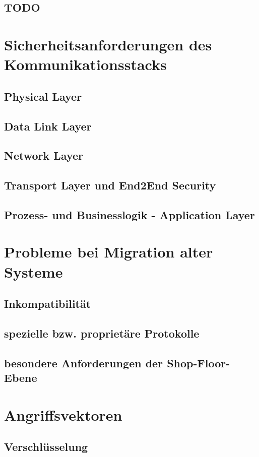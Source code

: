 \subsection{TODO}

\section{Sicherheitsanforderungen des Kommunikationsstacks}
\subsection{Physical Layer}
\subsection{Data Link Layer}
\subsection{Network Layer}
\subsection{Transport Layer und End2End Security}
\subsection{Prozess- und Businesslogik - Application Layer}

\section{Probleme bei Migration alter Systeme}
\subsection{Inkompatibilität}
\subsection{spezielle bzw. proprietäre Protokolle}
\subsection{besondere Anforderungen der Shop-Floor-Ebene}

\section{Angriffsvektoren}
\subsection{Verschlüsselung}

